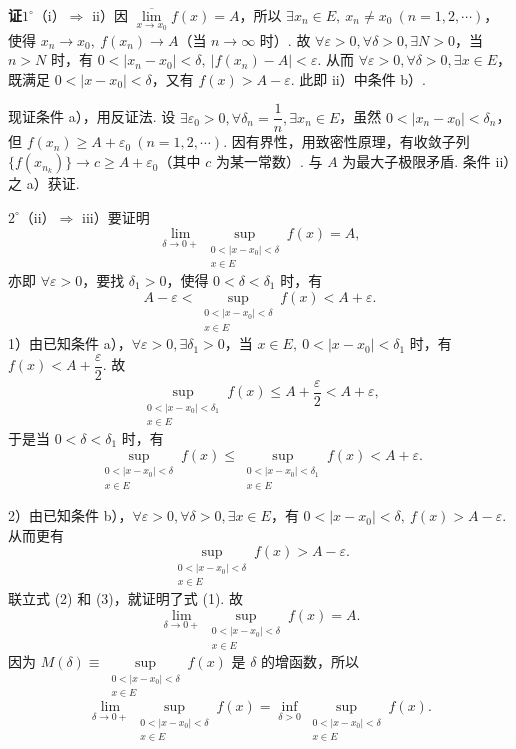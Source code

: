 \documentclass[UTF8,12pt,a4paper,fontset=fandol]{ctexart}
\begin{document}
\noindent\textbf{证}\quad $1^\circ$（i）$\Rightarrow$ ii）因 $\overline{\lim\limits_{x\to x_0}}f(x)=A$，所以 $\exists x_n\in E,\ x_n\ne x_0\ (n=1,2,\cdots)$，使得 $x_n\to x_0,\ f(x_n)\to A$（当 $n\to\infty$ 时）. 故 $\forall \varepsilon>0,\forall\delta>0,\exists N>0$，当 $n>N$ 时，有 $0<|x_n-x_0|<\delta,\ |f(x_n)-A|<\varepsilon$. 从而 $\forall \varepsilon>0,\forall\delta>0,\exists x\in E$，既满足 $0<|x-x_0|<\delta$，又有 $f(x)>A-\varepsilon$. 此即 ii）中条件 b）.

现证条件 a），用反证法. 设 $\exists\varepsilon_0>0,\forall \delta_n=\dfrac1n,\exists x_n\in E$，虽然 $0<|x_n-x_0|<\delta_n$，但 $f(x_n)\ge A+\varepsilon_0\ (n=1,2,\cdots)$. 因有界性，用致密性原理，有收敛子列 $\{f(x_{n_k})\}\to c\ge A+\varepsilon_0$（其中 $c$ 为某一常数）. 与 $A$ 为最大子极限矛盾. 条件 ii）之 a）获证.

$2^\circ$（ii）$\Rightarrow$ iii）要证明
\[
  \lim_{\delta\to0+}\sup_{\substack{0<|x-x_0|<\delta\\ x\in E}}f(x)=A,
\]
亦即 $\forall \varepsilon>0$，要找 $\delta_1>0$，使得 $0<\delta<\delta_1$ 时，有
\[
  A-\varepsilon<\sup_{\substack{0<|x-x_0|<\delta\\ x\in E}}f(x)<A+\varepsilon.
\tag{1}
\]
1）由已知条件 a），$\forall \varepsilon>0,\exists\delta_1>0$，当 $x\in E,\ 0<|x-x_0|<\delta_1$ 时，有 $f(x)<A+\dfrac{\varepsilon}{2}$. 故
\[
  \sup_{\substack{0<|x-x_0|<\delta_1\\ x\in E}}f(x)\le A+\frac{\varepsilon}{2}<A+\varepsilon,
\]
于是当 $0<\delta<\delta_1$ 时，有
\[
  \sup_{\substack{0<|x-x_0|<\delta\\ x\in E}}f(x)
  \le \sup_{\substack{0<|x-x_0|<\delta_1\\ x\in E}}f(x)<A+\varepsilon.
\tag{2}
\]

2）由已知条件 b），$\forall \varepsilon>0,\forall\delta>0,\exists x\in E$，有 $0<|x-x_0|<\delta,\ f(x)>A-\varepsilon$. 从而更有
\[
  \sup_{\substack{0<|x-x_0|<\delta\\ x\in E}}f(x)>A-\varepsilon.
\tag{3}
\]
联立式 (2) 和 (3)，就证明了式 (1). 故
\[
  \lim_{\delta\to0+}\sup_{\substack{0<|x-x_0|<\delta\\ x\in E}}f(x)=A.
\]
因为 $M(\delta)\equiv\sup\limits_{\substack{0<|x-x_0|<\delta\\ x\in E}}f(x)$ 是 $\delta$ 的增函数，所以
\[
  \lim_{\delta\to0+}\sup_{\substack{0<|x-x_0|<\delta\\ x\in E}}f(x)
  =\inf_{\delta>0}\sup_{\substack{0<|x-x_0|<\delta\\ x\in E}}f(x).
\]
\end{document}
